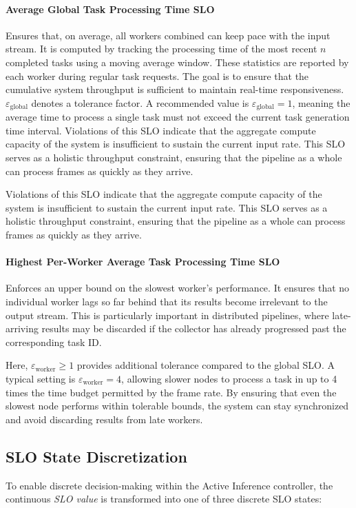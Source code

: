 \paragraph{Average Global Task Processing Time SLO} Ensures that, on average, all workers combined can keep pace with the input stream. It is computed by tracking the processing time of the most recent \(n\) completed tasks using a moving average window. These statistics are reported by each worker during regular task requests. The goal is to ensure that the cumulative system throughput is sufficient to maintain real-time responsiveness. \(\varepsilon_\text{global}\) denotes a tolerance factor. A recommended value is \(\varepsilon_\text{global} = 1\), meaning the average time to process a single task must not exceed the current task generation time interval. Violations of this SLO indicate that the aggregate compute capacity of the system is insufficient to sustain the current input rate. This SLO serves as a holistic throughput constraint, ensuring that the pipeline as a whole can process frames as quickly as they arrive.

Violations of this SLO indicate that the aggregate compute capacity of the system is insufficient to sustain the current input rate. This SLO serves as a holistic throughput constraint, ensuring that the pipeline as a whole can process frames as quickly as they arrive.

\paragraph{Highest Per-Worker Average Task Processing Time SLO} Enforces an upper bound on the slowest worker’s performance. It ensures that no individual worker lags so far behind that its results become irrelevant to the output stream. This is particularly important in distributed pipelines, where late-arriving results may be discarded if the collector has already progressed past the corresponding task ID.

Here, \(\varepsilon_\text{worker} \geq 1\) provides additional tolerance compared to the global SLO. A typical setting is \(\varepsilon_\text{worker} = 4\), allowing slower nodes to process a task in up to 4 times the time budget permitted by the frame rate. By ensuring that even the slowest node performs within tolerable bounds, the system can stay synchronized and avoid discarding results from late workers.

\subsection{SLO State Discretization}
To enable discrete decision-making within the Active Inference controller, the continuous \textit{SLO value} is transformed into one of three discrete SLO states:

